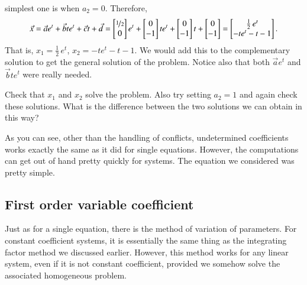 \documentclass[12pt]{book}
\begin{document}
\begin{example}
simplest
one is when $a_2 = 0$.
Therefore,
\begin{equation*}
\vec{x} = 
\vec{a}
e^{t}
+
\vec{b}
t
e^{t}
+
\vec{c}
t +
\vec{d}
=
\begin{bmatrix}
\nicefrac{1}{2} \\ 0
\end{bmatrix}
e^t
+
\begin{bmatrix}
0 \\ -1
\end{bmatrix}
te^t
+
\begin{bmatrix}
0 \\ -1
\end{bmatrix}
t
+
\begin{bmatrix}
0 \\ -1
\end{bmatrix}
=
\begin{bmatrix}
\frac{1}{2}\,e^t \\
-te^t - t - 1
\end{bmatrix} .
\end{equation*}
That is, $x_1 = \frac{1}{2}\,e^t$, $x_2 = 
-te^t - t - 1$.  We would add this to the complementary solution to get the
general solution of the problem.  Notice also that both $\vec{a} e^t$
and $\vec{b} te^t$ were really needed.
\end{example}

\begin{exercise}
Check that $x_1$ and $x_2$ solve the problem.  Also try setting $a_2 = 1$
and again check these solutions.  What is the difference between the two
solutions we can obtain in this way?
\end{exercise}

As you can see, other than the handling of conflicts, undetermined
coefficients works exactly the same as it did for
single equations.  However, the computations can get out of hand pretty
quickly for systems.  The equation we considered was pretty simple.

\subsection{First order variable coefficient}

Just as for a single equation, there is the method of
variation of parameters.
For constant coefficient systems, it is essentially
the same thing as the integrating factor method we discussed earlier.
However, this method works for any linear system, even if it is not
constant coefficient, provided we somehow solve the associated
homogeneous problem.
\end{document}
